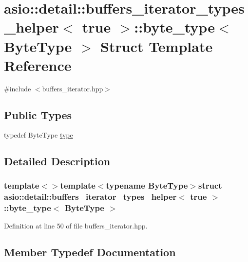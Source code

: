\hypertarget{structasio_1_1detail_1_1buffers__iterator__types__helper_3_01true_01_4_1_1byte__type}{}\section{asio\+:\+:detail\+:\+:buffers\+\_\+iterator\+\_\+types\+\_\+helper$<$ true $>$\+:\+:byte\+\_\+type$<$ Byte\+Type $>$ Struct Template Reference}
\label{structasio_1_1detail_1_1buffers__iterator__types__helper_3_01true_01_4_1_1byte__type}


{\ttfamily \#include $<$buffers\+\_\+iterator.\+hpp$>$}

\subsection*{Public Types}
\begin{DoxyCompactItemize}
\item 
typedef Byte\+Type \hyperlink{structasio_1_1detail_1_1buffers__iterator__types__helper_3_01true_01_4_1_1byte__type_ae33e5b0cb09ca144f1a2262a7a31502a}{type}
\end{DoxyCompactItemize}


\subsection{Detailed Description}
\subsubsection*{template$<$$>$template$<$typename Byte\+Type$>$struct asio\+::detail\+::buffers\+\_\+iterator\+\_\+types\+\_\+helper$<$ true $>$\+::byte\+\_\+type$<$ Byte\+Type $>$}



Definition at line 50 of file buffers\+\_\+iterator.\+hpp.



\subsection{Member Typedef Documentation}
\hypertarget{structasio_1_1detail_1_1buffers__iterator__types__helper_3_01true_01_4_1_1byte__type_ae33e5b0cb09ca144f1a2262a7a31502a}{}
